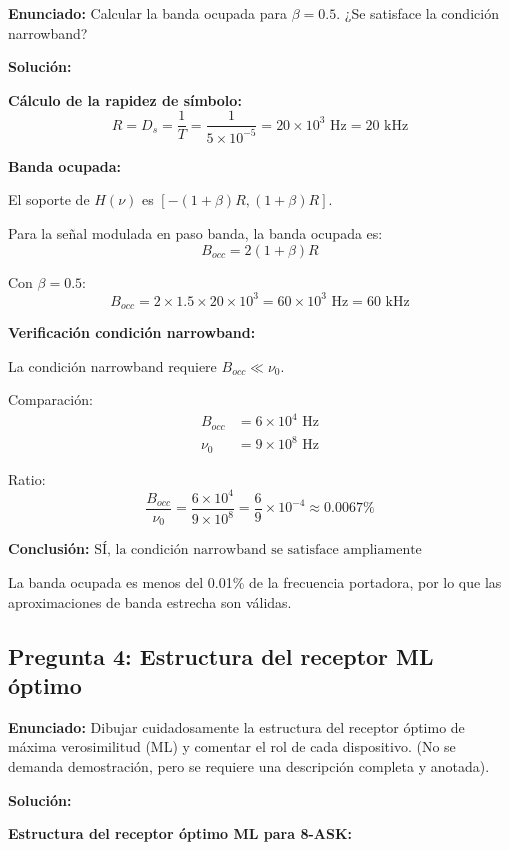 \documentclass[11pt,a4paper]{article}
\begin{document}
\textbf{Enunciado:} Calcular la banda ocupada para $\beta = 0.5$. ¿Se satisface la condici\'on narrowband?

\vspace{0.3cm}
\textbf{Soluci\'on:}

\textbf{C\'alculo de la rapidez de s\'imbolo:}
\[
R = D_s = \frac{1}{T} = \frac{1}{5 \times 10^{-5}} = 20 \times 10^3 \text{ Hz} = 20 \text{ kHz}
\]

\textbf{Banda ocupada:}

El soporte de $H(\nu)$ es $[-(1+\beta)R, (1+\beta)R]$.

Para la se\~nal modulada en paso banda, la banda ocupada es:
\[
B_{occ} = 2(1+\beta)R
\]

Con $\beta = 0.5$:
\[
B_{occ} = 2 \times 1.5 \times 20 \times 10^3 = \boxed{60 \times 10^3 \text{ Hz} = 60 \text{ kHz}}
\]

\textbf{Verificaci\'on condici\'on narrowband:}

La condici\'on narrowband requiere $B_{occ} \ll \nu_0$.

Comparaci\'on:
\begin{align*}
B_{occ} &= 6 \times 10^4 \text{ Hz} \\
\nu_0 &= 9 \times 10^8 \text{ Hz}
\end{align*}

Ratio:
\[
\frac{B_{occ}}{\nu_0} = \frac{6 \times 10^4}{9 \times 10^8} = \frac{6}{9} \times 10^{-4} \approx 0.0067\%
\]

\textbf{Conclusi\'on:} $\boxed{\text{SÍ, la condici\'on narrowband se satisface ampliamente}}$

La banda ocupada es menos del 0.01\% de la frecuencia portadora, por lo que las aproximaciones de banda estrecha son v\'alidas.



\subsection*{Pregunta 4: Estructura del receptor ML \'optimo}

\textbf{Enunciado:} Dibujar cuidadosamente la estructura del receptor \'optimo de m\'axima verosimilitud (ML) y comentar el rol de cada dispositivo. (No se demanda demostraci\'on, pero se requiere una descripci\'on completa y anotada).

\vspace{0.3cm}
\textbf{Soluci\'on:}

\textbf{Estructura del receptor \'optimo ML para 8-ASK:}
\end{document}
